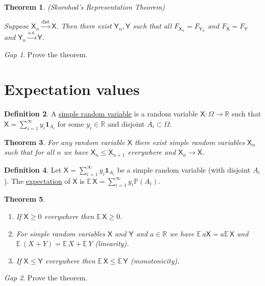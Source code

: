\documentclass[11pt]{article}
\newcommand{\rv}[1]{\mathsf{#1}}
\newcommand{\p}{\mathbb{P}}
\newcommand{\ex}{\mathbb{E}\,}
\newcommand{\charf}[1]{\mathbf{1}_{#1}}
\newcommand{\defname}[1]{\underline{#1}}
\newcommand{\asto}{\xrightarrow{\text{a.s.}}}
\newcommand{\disto}{\xrightarrow{\text{dist}}}
\newcommand{\RR}{\mathbb{R}}
\theoremstyle{theorem}
\newtheorem{theorem}{Theorem}[section]
\theoremstyle{definition}
\newtheorem{definition}[theorem]{Definition}
\theoremstyle{remark}
\theoremstyle{step}
\theoremstyle{gap}
\newtheorem*{gap}{Gap}
\begin{document}
\begin{theorem}{(Skorohod's Representation Theorem)}\ 

Suppose \(\rv{X}_n \disto \rv{X}\). Then there exist \(\rv{Y}_n, \rv{Y}\) such that all \(F_{\rv{X}_n} = F_{\rv{Y}_n}\) and \(F_\rv{X} = F_\rv{Y}\) and \(\rv{Y}_n \asto \rv{Y}\).
\end{theorem}

\begin{gap}
Prove the theorem.
\end{gap}


\section{Expectation values}

\begin{definition}
A \defname{simple random variable} is a random variable \(\rv{X}:\Omega \to \RR\) such that \(\rv{X} = \sum_{i=1}^\infty y_i \charf{A_i}\) for some \(y_i \in \RR\) and disjoint \(A_i \subset \Omega\).
\end{definition}

\begin{theorem}
For any random variable \(\rv{X}\) there exist simple random variables \(\rv{X}_n\) such that for all \(n\) we have \(\rv{X}_n \leq \rv{X}_{n+1}\) everywhere and \(\rv{X}_n \to \rv{X}\).
\end{theorem}

\begin{definition}
Let \(\rv{X} = \sum_{i=1}^\infty y_i \charf{A_i}\) be a simple random variable (with disjoint \(A_i\)). The \defname{expectation} of \(\rv{X}\) is \(\ex \rv{X} = \sum_{i=1}^\infty y_i \p(A_i)\).
\end{definition}

\begin{theorem}\ 
\begin{enumerate}
\item If \(\rv{X} \geq 0\) everywhere then \(\ex \rv{X} \geq 0\).
\item For simple random variables \(\rv{X}\) and \(\rv{Y}\) and \(a \in \RR\) we have \(\ex a \rv{X} = a \ex \rv{X}\) and \(\ex (X+Y) = \ex X + \ex Y\) (linearity).
\item If \(\rv{X} \leq \rv{Y}\) everywhere then \(\ex\rv{X} \leq \ex\rv{Y}\) (monotonicity).
\end{enumerate}
\end{theorem}

\begin{gap}
Prove the theorem.
\end{gap}
\end{document}
